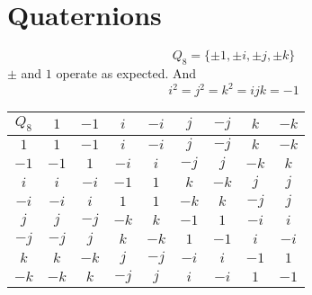 \documentclass[openany]{report}
\begin{document}
\section{Quaternions}
$$Q_8 = \{\pm 1, \pm i, \pm j, \pm k\}$$
$\pm$ and $1$ operate as expected. And 
$$i^2 = j^2 = k^2 = ijk = -1$$
\begin{center}
    \begin{tabular}{c|cccccccc}
        $Q_8$ & $1$ & $-1$ & $i$ & $-i$ & $j$ & $-j$ & $k$ & $-k$ \\
        \hline
        $1$ & $1$ & $-1$ & $i$ & $-i$ & $j$ & $-j$ & $k$ & $-k$ \\
        $-1$ & $-1$ & $1$ & $-i$ & $i$ & $-j$ & $j$ & $-k$ & $k$\\
        $i$ & $i$ & $-i$ & $-1$ & $1$ & $k$ & $-k$ & $j$ & $j$\\
        $-i$ & $-i$ & $i$ & $1$ & $1$ & $-k$ & $k$ & $-j$ & $j$\\
        $j$ & $j$ & $-j$ & $-k$ & $k$ & $-1$ & $1$ & $-i$ & $i$\\
        $-j$ & $-j$ & $j$ & $k$ & $-k$ & $1$ & $-1$ & $i$ & $-i$\\
        $k$ & $k$ & $-k$ & $j$ & $-j$ & $-i$ & $i$ & $-1$ & $1$\\
        $-k$ & $-k$ & $k$ & $-j$ & $j$ & $i$ & $-i$ & $1$ & $-1$\\
    \end{tabular}
\end{center}
\end{document}
